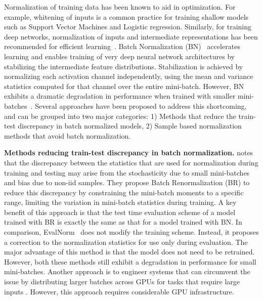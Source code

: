\documentclass[10pt,twocolumn,letterpaper]{article}
\newcommand{\batchnorm}{BN}
\begin{document}
Normalization of training data has been known to aid in optimization. For example, whitening of inputs is a common practice for training shallow models such as Support Vector Machines and Logistic regression. Similarly, for training deep networks, normalization of inputs and intermediate representations has been recommended for efficient learning~\cite{lecun2012efficient,lecun1998efficient,glorot2010understanding}. 
Batch Normalization (BN)~\cite{batchnorm} accelerates learning and enables training of very deep neural network architectures by stabilizing the intermediate feature distributions. Stabilization is achieved by normalizing each activation channel independently, using the mean and variance statistics computed for that channel over the entire mini-batch. 
However, \batchnorm{} exhibits a dramatic degradation in performance when trained with smaller mini-batches~\cite{groupnorm, evalnorm}. Several approaches have been proposed to address this shortcoming, and can be grouped into two major categories: 1) Methods that reduce the train-test discrepancy in batch normalized models, 2) Sample based normalization methods that avoid batch normalization.

\medskip
\noindent
\textbf{Methods reducing train-test discrepancy in batch normalization.}
\citet{batchrenorm} notes that the discrepancy between the statistics that are used for normalization during training and testing may arise from the stochasticity due to small mini-batches and bias due to non-iid samples. They propose Batch Renormalization (BR) to reduce this discrepancy by constraining the mini-batch moments to a specific range, limiting the variation in mini-batch statistics during training. A key benefit of this approach is that the test time evaluation scheme of a model trained with BR is exactly the same as that for a model trained with \batchnorm{}. In comparison, EvalNorm~\cite{evalnorm} does not modify the training scheme. Instead, it proposes a correction to the normalization statistics for use only during evaluation. The major advantage of this method is that the model does not need to be retrained. However, both these methods still exhibit a degradation in performance for small mini-batches. Another approach is to engineer systems that can circumvent the issue by distributing larger batches across GPUs for tasks that require large inputs \cite{peng2017megdet}. However, this approach requires considerable GPU infrastructure.
\end{document}
